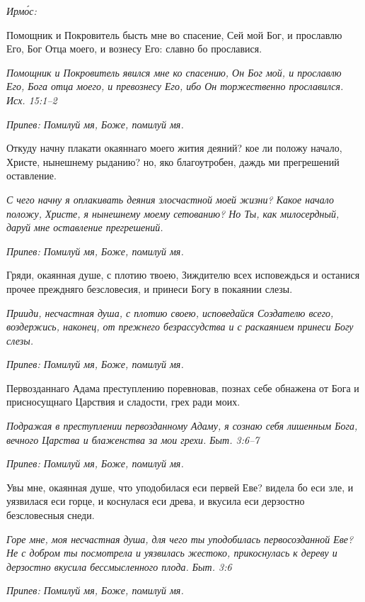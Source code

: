 \itshape Ирмо́с:\normalfont{}


Помощник и Покровитель бысть мне во спасение, Сей мой Бог, и прославлю Его, Бог Отца моего, и вознесу Его: славно бо прославися.


\itshape Помощник и Покровитель явился мне ко спасению, Он Бог мой, и прославлю Его, Бога отца моего, и превознесу Его, ибо Он торжественно прославился. Исх. 15:1–2\normalfont{}


\itshape Припев:\normalfont{} Помилуй мя, Боже, помилуй мя.


Откуду начну плакати окаяннаго моего жития деяний? кое ли положу начало, Христе, нынешнему рыданию? но, яко благоутробен, даждь ми прегрешений оставление.


\itshape С чего начну я оплакивать деяния злосчастной моей жизни? Какое начало положу, Христе, я нынешнему моему сетованию? Но Ты, как милосердный, даруй мне оставление прегрешений.\normalfont{}


\itshape Припев:\normalfont{} Помилуй мя, Боже, помилуй мя.


Гряди, окаянная душе, с плотию твоею, Зиждителю всех исповеждься и останися прочее преждняго безсловесия, и принеси Богу в покаянии слезы.


\itshape Прииди, несчастная душа, с плотию своею, исповедайся Создателю всего, воздержись, наконец, от прежнего безрассудства и с раскаянием принеси Богу слезы.\normalfont{}


\itshape Припев:\normalfont{} Помилуй мя, Боже, помилуй мя.


Первозданнаго Адама преступлению поревновав, познах себе обнажена от Бога и присносущнаго Царствия и сладости, грех ради моих.


\itshape Подражая в преступлении первозданному Адаму, я сознаю себя лишенным Бога, вечного Царства и блаженства за мои грехи. Быт. 3:6–7\normalfont{}


\itshape Припев:\normalfont{} Помилуй мя, Боже, помилуй мя.


Увы мне, окаянная душе, что уподобилася еси первей Еве? видела бо еси зле, и уязвилася еси горце, и коснулася еси древа, и вкусила еси дерзостно безсловесныя снеди.


\itshape Горе мне, моя несчастная душа, для чего ты уподобилась первосозданной Еве? Не с добром ты посмотрела и уязвилась жестоко, прикоснулась к дереву и дерзостно вкусила бессмысленного плода. Быт. 3:6\normalfont{}


\itshape Припев:\normalfont{} Помилуй мя, Боже, помилуй мя.


